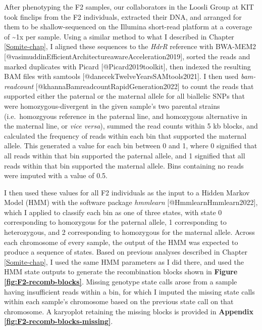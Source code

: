\documentclass[
]{article}
\begin{document}
After phenotyping the F2 samples, our collaborators in the Loosli Group at KIT took finclips from the F2 individuals, extracted their DNA, and arranged for them to be shallow-sequenced on the Illumina short-read platform at a coverage of \textasciitilde1x per sample. Using a similar method to what I described in Chapter \ref{Somite-chap}, I aligned these sequences to the \emph{HdrR} reference with BWA-MEM2 {[}@vasimuddinEfficientArchitectureawareAcceleration2019{]}, sorted the reads and marked duplicates with Picard {[}@Picard2019toolkit{]}, then indexed the resulting BAM files with samtools {[}@danecekTwelveYearsSAMtools2021{]}. I then used \emph{bam-readcount} {[}@khannaBamreadcountRapidGeneration2022{]} to count the reads that supported either the paternal or the maternal allele for all biallelic SNPs that were homozygous-divergent in the given sample's two parental strains (i.e.~homozgyous reference in the paternal line, and homozygous alternative in the maternal line, or \emph{vice versa}), summed the read counts within 5 kb blocks, and calculated the frequency of reads within each bin that supported the maternal allele. This generated a value for each bin between 0 and 1, where 0 signified that all reads within that bin supported the paternal allele, and 1 signified that all reads within that bin supported the maternal allele. Bins containing no reads were imputed with a value of 0.5.

I then used these values for all F2 individuals as the input to a Hidden Markov Model (HMM) with the software package \emph{hmmlearn} {[}@HmmlearnHmmlearn2022{]}, which I applied to classify each bin as one of three states, with state 0 corresponding to homozygous for the paternal allele, 1 corresponding to heterozygous, and 2 corresponding to homozygous for the maternal allele. Across each chromosome of every sample, the output of the HMM was expected to produce a sequence of states. Based on previous analyses described in Chapter \ref{Somite-chap}, I used the same HMM parameters as I did there, and used the HMM state outputs to generate the recombination blocks shown in \textbf{Figure \ref{fig:F2-recomb-blocks}}. Missing genotype state calls arose from a sample having insufficient reads within a bin, for which I imputed the missing state calls within each sample's chromosome based on the previous state call on that chromosome. A karyoplot retaining the missing blocks is provided in \textbf{Appendix \ref{fig:F2-recomb-blocks-missing}}.
\end{document}
